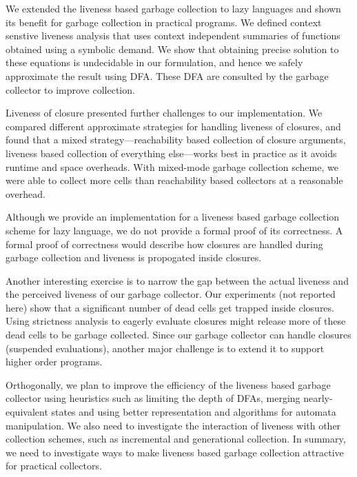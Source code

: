 \documentclass[9pt]{sigplanconf}
\begin{document}
{\color{blue}We extended the liveness based garbage collection to lazy
  languages and shown its benefit  for garbage collection in practical
  programs. We  defined context  senstive liveness analysis  that uses
  context independent summaries of functions obtained using a symbolic
  demand. We show  that obtaining precise solution  to these equations
  is undecidable in  our formulation, and hence  we safely approximate
  the result using DFA. These DFA are consulted by the garbage collector
  to improve  collection.

  Liveness   of   closure   presented  further   challenges   to   our
  implementation.   We compared  different approximate  strategies for
  handling   liveness   of   closures,   and  found   that   a   mixed
  strategy---reachability  based  collection   of  closure  arguments,
  liveness  based  collection  of   everything  else---works  best  in
  practice as it  avoids runtime and space  overheads.  With mixed-mode
  garbage collection scheme,  we were able to collect  more cells than
  reachability based collectors at a reasonable overhead.

  Although we  provide an  implementation for  a liveness  based garbage
  collection scheme for lazy language, we  do not provide a formal proof
  of its correctness.  A formal  proof of correctness would describe how
  closures  are  handled  during  garbage  collection  and  liveness  is
  propogated inside closures. 

  Another interesting exercise is to narrow the gap between the actual
  liveness and  the perceived liveness  of our garbage  collector. Our
  experiments (not  reported here) show  that a significant  number of
  dead cells  get trapped inside closures.   Using strictness analysis
  to eagerly evaluate closures might  release more of these dead cells
  to be  garbage collected.   Since our  garbage collector  can handle
  closures  (suspended evaluations),  another  major  challenge is  to
  extend it to support higher order programs.

  Orthogonally,  we plan  to improve  the efficiency  of the  liveness
  based garbage collector using heuristics  such as limiting the depth
  of  DFAs,   merging  nearly-equivalent   states  and   using  better
  representation  and algorithms  for automata  manipulation. We  also
  need  to   investigate  the  interaction  of   liveness  with  other
  collection schemes, such as incremental and generational collection.
  In  summary, we  need to  investigate  ways to  make liveness  based
  garbage collection attractive for practical collectors.  }
\end{document}
